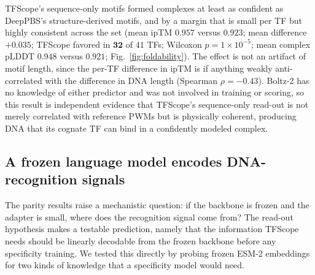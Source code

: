 \documentclass[11pt]{article}
\begin{document}
TFScope's sequence-only motifs formed complexes at least as confident as DeepPBS's
structure-derived motifs, and by a margin that is small per TF but highly consistent
across the set (mean ipTM $\mathbf{0.957}$ versus $0.923$; mean difference $+0.035$;
TFScope favored in $\mathbf{32}$ of $41$ TFs; Wilcoxon $p=1\times10^{-5}$; mean
complex pLDDT $0.948$ versus $0.921$; Fig.~\ref{fig:foldability}). The effect is not
an artifact of motif length, since the per-TF difference in ipTM is if anything
weakly anti-correlated with the difference in DNA length (Spearman $\rho=-0.43$).
Boltz-2 has no knowledge of either predictor and was not involved in training or
scoring, so this result is independent evidence that TFScope's sequence-only read-out
is not merely correlated with reference PWMs but is physically coherent, producing DNA
that its cognate TF can bind in a confidently modeled complex.

\subsection*{A frozen language model encodes DNA-recognition signals}

The parity results raise a mechanistic question: if the backbone is frozen and the
adapter is small, where does the recognition signal come from? The read-out
hypothesis makes a testable prediction, namely that the information TFScope needs
should be linearly decodable from the frozen backbone before any specificity
training. We tested this directly by probing frozen ESM-2 embeddings for two kinds
of knowledge that a specificity model would need.
\end{document}
